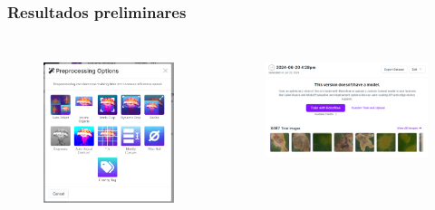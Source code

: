 \documentclass[aspectratio=169]{beamer}
\begin{document}






\begin{frame}
    \frametitle{Resultados preliminares}


    \begin{columns}



        \begin{figure}
            \centering
            \includegraphics[scale = 0.35]{img/preprocessRoboflow.png}
            \label{fig:entelabel}
        \end{figure}



        \begin{figure}
            \centering
            \includegraphics[scale = 0.35]{img/exportRRoboflow.png}
            \label{fig:entelabel}
        \end{figure}



\end{columns}
\end{frame}
\end{document}
